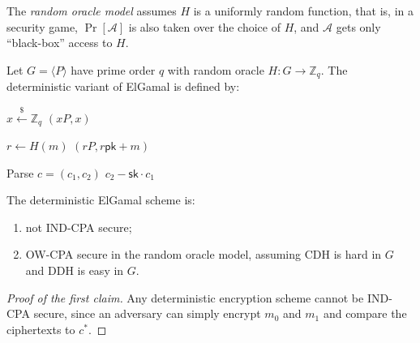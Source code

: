 The \emph{random oracle model} assumes \(H\) is a uniformly random function, that is, in a security game, \(\Pr[\mathcal{A}]\) is also taken over the choice of \(H\), and \(\mathcal{A}\) gets only ``black-box'' access to \(H\).

\begin{example}\label{ex:det-elgamal}
    Let \(G = \langle P \rangle\) have prime order \(q\) with random oracle \(H \colon G \to \mathbb{Z}_q\).
    The deterministic variant of ElGamal is defined by:

    \noindent
    \begin{minipage}[t]{0.30\linewidth}%
    \begin{algorithmic}[1]
            \State \(x \xleftarrow{\$} \mathbb{Z}_q\)
            \State \Return \((xP, x)\)
        \EndProcedure
    \end{algorithmic}%
    \end{minipage}\hfill
    \begin{minipage}[t]{0.36\linewidth}%
    \begin{algorithmic}[1]
            \State \(r \gets H(m)\)
            \State \Return \((rP, r\mathsf{pk} + m)\)
        \EndProcedure
    \end{algorithmic}%
    \end{minipage}\hfill
    \begin{minipage}[t]{0.32\linewidth}%
    \begin{algorithmic}[1]
            \State Parse \(c = (c_1, c_2)\)
            \State \Return \(c_2 - \mathsf{sk} \cdot c_1\)
        \EndProcedure
    \end{algorithmic}%
    \end{minipage}%
\end{example}

\begin{proposition}
    The deterministic ElGamal scheme is:
    \begin{enumerate}
        \item not IND-CPA secure;
        \item OW-CPA secure in the random oracle model, assuming CDH is hard in \(G\) and DDH is easy in \(G\).
    \end{enumerate}
\end{proposition}

\begin{proof}[Proof of the first claim]
    Any deterministic encryption scheme cannot be IND-CPA secure, since an adversary can simply encrypt \(m_0\) and \(m_1\) and compare the ciphertexts to \(c^*\).
\end{proof}


